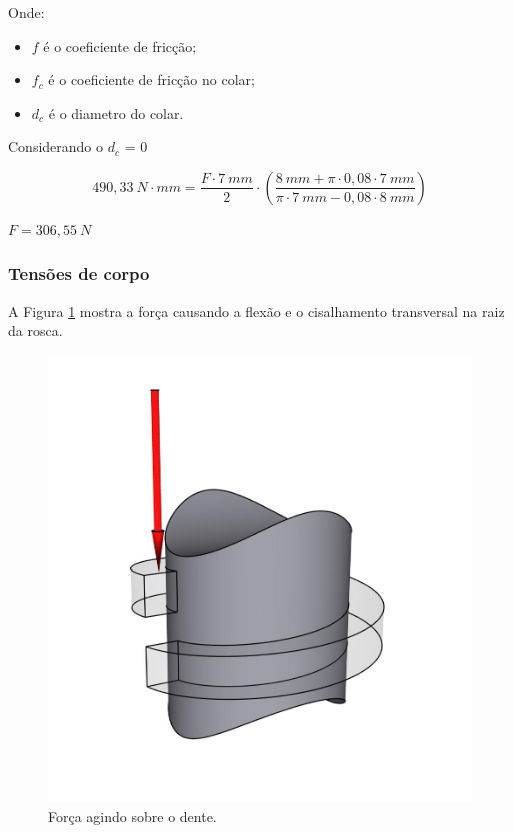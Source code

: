Onde:
\begin{itemize}
    \item $f$ é o coeficiente de fricção;
    \item $f_{c}$ é o coeficiente de fricção no colar;
    \item $d_{c}$ é o diametro do colar.
\end{itemize}

Considerando o $d_{c}$ = 0

$$490,33~N \cdot mm = \frac{F \cdot 7~mm}{2} \cdot (\frac{8~mm + \pi \cdot 0,08 \cdot 7~mm}{\pi \cdot 7~mm - 0,08 \cdot 8~mm})$$

$F = 306,55~N$

\subsubsection{Tensões de corpo}

A Figura \ref{fig:forcadente} mostra a força causando a flexão e o cisalhamento transversal na raiz da rosca.

\begin{figure}[H]
\centering
\caption{Força agindo sobre o dente.}\label{fig:forcadente}
\includegraphics[scale = 0.2]{figuras/forcadente}
\end{figure}

